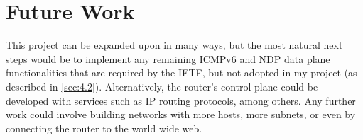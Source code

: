 \section{Future Work}
\label{sec:5.3}

This project can be expanded upon in many ways, but the most natural next steps would be to implement any remaining ICMPv6 and NDP data plane functionalities that are required by the IETF, but not adopted in my project (as described in \cref{sec:4.2}). Alternatively, the router's control plane could be developed with services such as IP routing protocols, among others. Any further work could involve building networks with more hosts, more subnets, or even by connecting the router to the world wide web.